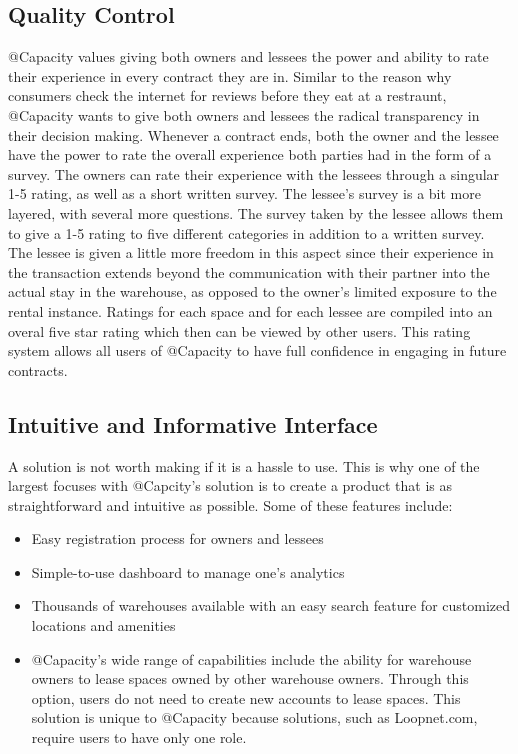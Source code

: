 \subsection{Quality Control}
@Capacity values giving both owners and lessees the power and ability to rate their experience in every contract they are in. Similar to the reason why consumers check the internet for reviews before they eat at a restraunt, @Capacity wants to give both owners and lessees the radical transparency in their decision making. Whenever a contract ends, both the owner and the lessee have the power to rate the overall experience both parties had in the form of a survey. The owners can rate their experience with the lessees through a singular 1-5 rating, as well as a short written survey. The lessee's survey is a bit more layered, with several more questions. The survey taken by the lessee allows them to give a 1-5 rating to five different categories in addition to a written survey. The lessee is given a little more freedom in this aspect since their experience in the transaction extends beyond the communication with their partner into the actual stay in the warehouse, as opposed to the owner's limited exposure to the rental instance. Ratings for each space and for each lessee are compiled into an overal five star rating which then can be viewed by other users. This rating system allows all users of @Capacity to have full confidence in engaging in future contracts.
\subsection{Intuitive and Informative Interface}
A solution is not worth making if it is a hassle to use. This is why one of the largest focuses with @Capcity's solution is to create a product that is as straightforward and intuitive as possible. Some of these features include:
\begin{itemize}
\item Easy registration process for owners and lessees
\item Simple-to-use dashboard to manage one's analytics
\item Thousands of warehouses available with an easy search feature for customized locations and amenities
\item @Capacity's wide range of capabilities include the ability for warehouse owners to lease spaces owned by other warehouse owners.  Through this option, users do not need to create new accounts to lease spaces.  This solution is unique to @Capacity because solutions, such as Loopnet.com, require users to have only one role.
\end{itemize}

